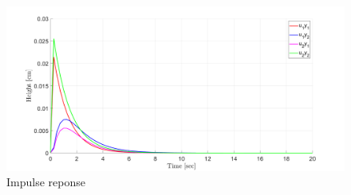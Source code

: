 \begin{figure}[H]
    \centering
    \includegraphics[width=1\textwidth]{Figures/Pr3.6_Markov.png}
    \caption{Impulse reponse}
    \label{fig:Markov}
\end{figure}